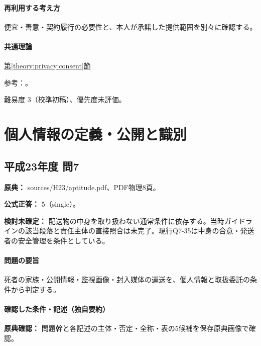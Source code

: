 \paragraph{再利用する考え方} 便宜・善意・契約履行の必要性と、本人が承諾した提供範囲を別々に確認する。

\paragraph{共通理論} \hyperref[theory:privacy:consent]{第\ref*{theory:privacy:consent}節}

\par 参考：\cite{privacy_general,privacy_consent2017,privacy_consent_current}。

\par 難易度 3（校準初稿）、優先度未評価。

\section{個人情報の定義・公開と識別}

\subsection{平成23年度 問7}
\label{q:h23-reg-apt-07}

\noindent\textbf{原典：} sources/H23/aptitude.pdf、PDF物理8頁。

\textbf{公式正答：} 5（single）。

\par\textbf{検討未確定：} 配送物の中身を取り扱わない通常条件に依存する。当時ガイドラインの該当段落と責任主体の直接照合は未完了。現行Q7-35は中身の合意・発送者の安全管理を条件としている。

\paragraph{問題の要旨} 死者の家族・公開情報・監視画像・封入媒体の運送を、個人情報と取扱委託の条件から判定する。

\paragraph{確認した条件・記述（独自要約）}\mbox{}\par

\noindent\textbf{原典確認：} 問題幹と各記述の主体・否定・全称・表の5候補を保存原典画像で確認。\par

